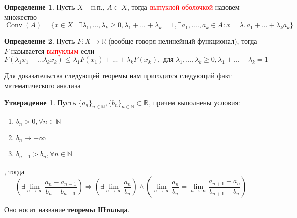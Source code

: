 \documentclass[12pt,a4paper]{article}
\theoremstyle{definition}
\newtheorem{definition}{Определение}[section]
\newtheorem{proposition}{Утверждение}[section]
\newcommand{\Real}{\mathbb{R}}
\newcommand{\Natural}{\mathbb{N}}
\newcommand{\setbuild}[2]{\{#1\:|\:#2\}}
\DeclareMathOperator{\Conv}{Conv}
\newcommand{\seq}[2]{\{#1\}_{#2}}
\begin{document}
\begin{definition}
	Пусть $X$ -- н.п., $A \subset X$, тогда \textcolor{red}{выпуклой оболочкой} назовем множество
	$$\Conv(A) = \setbuild{x\in X}{\exists \lambda_1, ..., \lambda_k \geq 0, \lambda_1 + ... + \lambda_k = 1, \exists a_1, ...., a_k \in A: x = \lambda_1 a_1 + ... + \lambda_k a_k}$$
\end{definition}
\begin{definition}
	Пусть $F: X \to \Real$ (вообще говоря нелинейный функционал), тогда $F$ называется \textcolor{red}{выпуклым} если
	$$F(\lambda_1 x_1 + ... \lambda_k x_k) \leq \lambda_1 F(x_1) + ... + \lambda_k F(x_k), \text{ для } \lambda_1, ..., \lambda_k \geq 0, \lambda_1 + ... + \lambda_k = 1$$
\end{definition}

Для доказательства следующей теоремы нам пригодится следующий факт математического анализа
\begin{proposition}\label{prop:1}
	Пусть $\seq{a_n}{n\in\Natural}, \seq{b_n}{n\in\Natural} \subset \Real$, причем выполнены условия:
	\begin{enumerate}
		\item $b_n > 0, \forall n \in \Natural$
		\item $b_n \to +\infty$
		\item $b_{n+1} > b_n, \forall n \in \Natural$
	\end{enumerate}
	, тогда 
	$$\left(\exists \lim_{n\to\infty}{\frac{a_n - a_{n-1}}{b_n - b_{n-1}}}\right) \Rightarrow \left(\exists \lim_{n\to\infty}{\frac{a_n}{b_n}}\right) \wedge \left(\lim_{n\to\infty}{\frac{a_n}{b_n}} = \lim_{n\to\infty}{\frac{a_{n+1} - a_n}{b_{n+1} - b_n}}\right)$$
\end{proposition}
Оно носит название \textbf{теоремы Штольца}.
\end{document}
